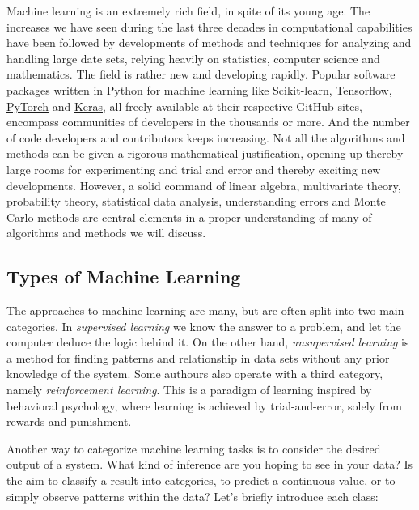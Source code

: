 \documentclass[%
oneside,                 %
final,                   %
10pt]{article}
\begin{document}
Machine learning is an extremely rich field, in spite of its young
age. The increases we have seen during the last three decades in
computational capabilities have been followed by developments of
methods and techniques for analyzing and handling large date sets,
relying heavily on statistics, computer science and mathematics.  The
field is rather new and developing rapidly. Popular software packages
written in Python for machine learning like
\href{{http://scikit-learn.org/stable/}}{Scikit-learn},
\href{{https://www.tensorflow.org/}}{Tensorflow},
\href{{http://pytorch.org/}}{PyTorch} and \href{{https://keras.io/}}{Keras}, all
freely available at their respective GitHub sites, encompass
communities of developers in the thousands or more. And the number of
code developers and contributors keeps increasing. Not all the
algorithms and methods can be given a rigorous mathematical
justification, opening up thereby large rooms for experimenting and
trial and error and thereby exciting new developments.  However, a
solid command of linear algebra, multivariate theory, probability
theory, statistical data analysis, understanding errors and Monte
Carlo methods are central elements in a proper understanding of many
of algorithms and methods we will discuss.



\subsection{Types of Machine Learning}


The approaches to machine learning are many, but are often split into
two main categories.  In \emph{supervised learning} we know the answer to a
problem, and let the computer deduce the logic behind it. On the other
hand, \emph{unsupervised learning} is a method for finding patterns and
relationship in data sets without any prior knowledge of the system.
Some authours also operate with a third category, namely
\emph{reinforcement learning}. This is a paradigm of learning inspired by
behavioral psychology, where learning is achieved by trial-and-error,
solely from rewards and punishment.

Another way to categorize machine learning tasks is to consider the
desired output of a system. What kind of inference are you hoping to see in your data? Is the aim to classify a result into categories, to predict a continuous value, or to simply observe patterns within the data? Let’s briefly introduce each class:
\end{document}
